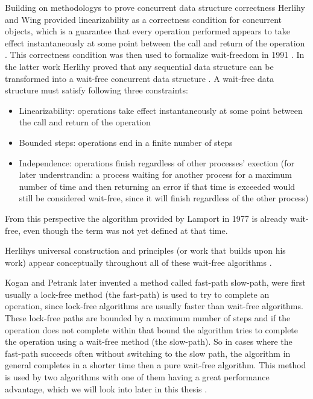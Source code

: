 Building on methodologys to prove concurrent data structure correctness Herlihy and Wing provided linearizability as a correctness condition for concurrent objects, which is a guarantee that every operation performed appears to take effect instantaneously at some point between the call and return of the operation \cite{HerlihyLinearizability}. This correctness condition was then used to formalize wait-freedom in 1991 \cite{herlihy1991wait}. In the latter work Herlihy proved that any sequential data structure can be transformed into a wait-free concurrent data structure \cite{herlihy1991wait}. A wait-free data structure must satisfy following three constraints: 
\begin{itemize}
   \item Linearizability: operations take effect instantaneously at some point between the call and return of the operation
   \item Bounded steps: operations end in a finite number of steps
   \item Independence: operations finish regardless of other processes' exection (for later understrandin: a process waiting for another process for a maximum number of time and then returning an error if that time is exceeded would still be considered wait-free, since it will finish regardless of the other process)
\end{itemize}
From this perspective the algorithm provided by Lamport in 1977 is already wait-free, even though the term was not yet defined at that time. \cite{herlihy1991wait,HerlihyLinearizability}

Herlihys universal construction and principles (or work that builds upon his work) appear conceptually throughout all of these wait-free algorithms \cite{Kogan2011WaitFreeQueues,FeldmanDechev2015WaitFreeRingBuffer,kogan2012methodology,FeldmanDechevV2,FeldmanDechevV3,RamalheteQueue,wCQWaitFreeQueue,Verma2013Scalable,FastFetchAndAddWaitFreeQueue,WangCacheCoherent,adampsc,jiffy,JayantiLog,Drescher2015GuardedSections,Mateíspmc,torquati2010singleproducersingleconsumerqueuessharedcache,Aldinucci2012EfficientSync,Wang2013BQueue,MaffioneCacheAware,ffq}. \cite{herlihy1991wait}

Kogan and Petrank later invented a method called fast-path slow-path, were first usually a lock-free method (the fast-path) is used to try to complete an operation, since lock-free algorithms are usually faster than wait-free algorithms. These lock-free paths are bounded by a maximum number of steps and if the operation does not complete within that bound the algorithm tries to complete the operation using a wait-free method (the slow-path). So in cases where the fast-path succeeds often without switching to the slow path, the algorithm in general completes in a shorter time then a pure wait-free algorithm. This method is used by two algorithms with one of them having a great performance advantage, which we will look into later in this thesis \cite{wCQWaitFreeQueue,FastFetchAndAddWaitFreeQueue}. \cite{kogan2012methodology}